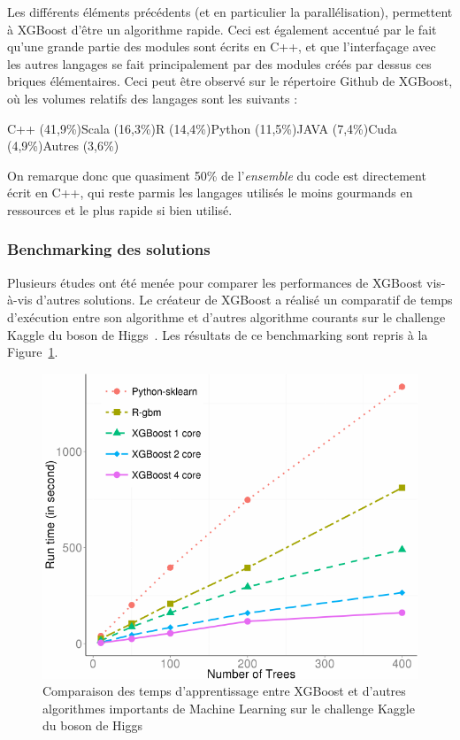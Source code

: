 Les différents éléments précédents (et en particulier la parallélisation), permettent à XGBoost d'être un algorithme rapide. Ceci est également accentué par le fait qu'une grande partie des modules sont écrits en C++, et que l'interfaçage avec les autres langages se fait principalement par des modules créés par dessus ces briques élémentaires. Ceci peut être observé sur le répertoire Github de XGBoost, où les volumes relatifs des langages sont les suivants :
\begin{center}
	C++ (41,9\%)\hspace{1cm}Scala (16,3\%)\hspace{1cm}R (14,4\%)\hspace{1cm}Python (11,5\%)\hspace{1cm}JAVA (7,4\%)\hspace{1cm}Cuda (4,9\%)\hspace{1cm}Autres (3,6\%)
\end{center}
On remarque donc que quasiment 50\% de l'\textit{ensemble} du code est directement écrit en C++, qui reste parmis les langages utilisés le moins gourmands en ressources et le plus rapide si bien utilisé.

\subsubsection{Benchmarking des solutions}
Plusieurs études ont été menée pour comparer les performances de XGBoost vis-à-vis d'autres solutions.
Le créateur de XGBoost a réalisé un comparatif de temps d'exécution entre son algorithme et d'autres algorithme courants sur le challenge Kaggle du boson de Higgs~\cite{bib:boson}. Les résultats de ce benchmarking sont repris à la Figure~\ref{fig:perfun}.

\begin{figure}[h]
	\begin{margincap}
		\centering
		\includegraphics[width=.6\textwidth]{images/More/perf_un}
		\caption{Comparaison des temps d'apprentissage entre XGBoost et d'autres algorithmes importants de Machine Learning sur le challenge Kaggle du boson de Higgs \cite{bib:bench}}
		\label{fig:perfun}
	\end{margincap}
\end{figure}


